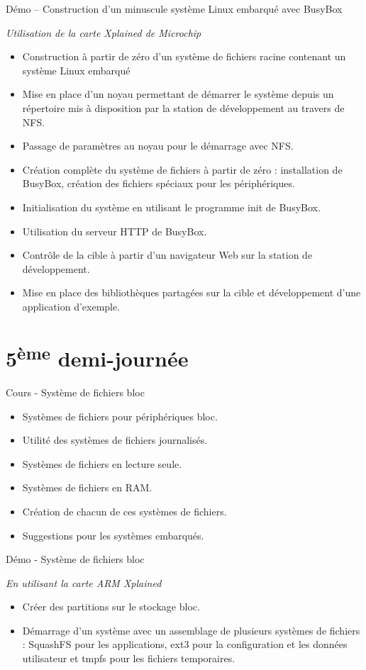 \documentclass[a4paper,12pt,obeyspaces,spaces,hyphens]{article}
\begin{document}
\feagendaonecolumn
{Démo – Construction d'un minuscule système Linux embarqué avec BusyBox}
{
  {\em Utilisation de la carte Xplained de Microchip}
  \begin{itemize}
  \item Construction à partir de zéro d'un système de fichiers racine
	contenant un système Linux embarqué
  \item Mise en place d'un noyau permettant de démarrer le système
	depuis un répertoire mis à disposition par la station de
	développement au travers de NFS.
  \item Passage de paramètres au noyau pour le démarrage avec NFS.
  \item Création complète du système de fichiers à partir de zéro :
	installation de BusyBox, création des fichiers spéciaux
	pour les périphériques.
  \item Initialisation du système en utilisant le programme init de BusyBox.
  \item Utilisation du serveur HTTP de BusyBox.
  \item Contrôle de la cible à partir d'un navigateur Web sur la
	station de développement.
  \item Mise en place des bibliothèques partagées sur la cible et
	développement d'une application d'exemple.
  \end{itemize}
}

\section{5\textsuperscript{ème} demi-journée}

\feagendatwocolumn
{Cours - Système de fichiers bloc}
{
  \begin{itemize}
  \item Systèmes de fichiers pour périphériques bloc.
  \item Utilité des systèmes de fichiers journalisés.
  \item Systèmes de fichiers en lecture seule.
  \item Systèmes de fichiers en RAM.
  \item Création de chacun de ces systèmes de fichiers.
  \item Suggestions pour les systèmes embarqués.
  \end{itemize}
}
{Démo - Système de fichiers bloc}
{
  {\em En utilisant la carte ARM Xplained}
  \begin{itemize}
  \item Créer des partitions sur le stockage bloc.
  \item Démarrage d'un système avec un assemblage de plusieurs systèmes
	de fichiers : SquashFS pour les applications, ext3 pour la
	configuration et les données utilisateur et tmpfs pour les
	fichiers temporaires.
  \end{itemize}
}
\end{document}
